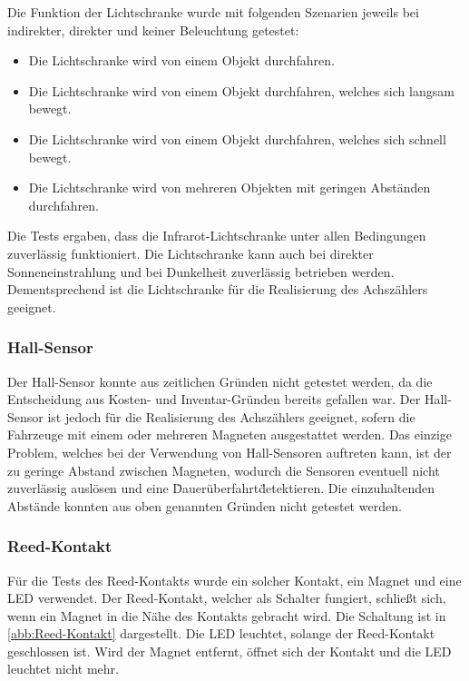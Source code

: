 Die Funktion der Lichtschranke wurde mit folgenden Szenarien jeweils bei indirekter, direkter und keiner Beleuchtung getestet:

\begin{itemize}
    \item Die Lichtschranke wird von einem Objekt durchfahren.
    \item Die Lichtschranke wird von einem Objekt durchfahren, welches sich langsam bewegt.
    \item Die Lichtschranke wird von einem Objekt durchfahren, welches sich schnell bewegt.
    \item Die Lichtschranke wird von mehreren Objekten mit geringen Abständen durchfahren.
\end{itemize}

Die Tests ergaben, dass die Infrarot-Lichtschranke unter allen Bedingungen zuverlässig funktioniert. Die Lichtschranke kann auch bei direkter Sonneneinstrahlung und bei Dunkelheit zuverlässig betrieben werden. Dementsprechend ist die Lichtschranke für die Realisierung des Achszählers geeignet.

\subsubsection{Hall-Sensor}\label{text:Entwicklung-der-GFA:Achszähler:Sensor-Tests:Hall-Sensor}

Der Hall-Sensor konnte aus zeitlichen Gründen nicht getestet werden, da die Entscheidung aus Kosten- und Inventar-Gründen bereits gefallen war. Der Hall-Sensor ist jedoch für die Realisierung des Achszählers geeignet, sofern die Fahrzeuge mit einem oder mehreren Magneten ausgestattet werden. Das einzige Problem, welches bei der Verwendung von Hall-Sensoren auftreten kann, ist der zu geringe Abstand zwischen Magneten, wodurch die Sensoren eventuell nicht zuverlässig auslösen und eine \"Dauerüberfahrt\" detektieren. Die einzuhaltenden Abstände konnten aus oben genannten Gründen nicht getestet werden.

\subsubsection{Reed-Kontakt}\label{text:Entwicklung-der-GFA:Achszähler:Sensor-Tests:Reed-Kontakt}

Für die Tests des Reed-Kontakts wurde ein solcher Kontakt, ein Magnet und eine LED verwendet. Der Reed-Kontakt, welcher als Schalter fungiert, schließt sich, wenn ein Magnet in die Nähe des Kontakts gebracht wird. Die Schaltung ist in \autoref{abb:Reed-Kontakt} dargestellt. Die LED leuchtet, solange der Reed-Kontakt geschlossen ist. Wird der Magnet entfernt, öffnet sich der Kontakt und die LED leuchtet nicht mehr.

